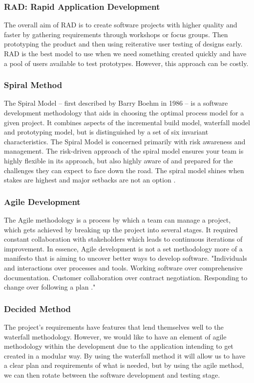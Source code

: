 \documentclass[a4paper,10pt]{article}
\begin{document}
\subsubsection{RAD: Rapid Application Development}
The overall aim of RAD is to create software projects with higher quality and faster by gathering requirements through workshops or focus groups. Then prototyping the product and then using reiterative user testing of designs early. RAD is the best model to use when we need something created quickly and have a pool of users available to test prototypes. However, this approach can be costly\cite{cscm01slides}. 

\subsubsection{Spiral Method}
The Spiral Model – first described by Barry Boehm in 1986 – is a software development methodology that aids in choosing the optimal process model for a given project. It combines aspects of the incremental build model, waterfall model and prototyping model, but is distinguished by a set of six invariant characteristics. The Spiral Model is concerned primarily with risk awareness and management. The risk-driven approach of the spiral model ensures your team is highly flexible in its approach, but also highly aware of and prepared for the challenges they can expect to face down the road. The spiral model shines when stakes are highest and major setbacks are not an option \cite{spiralmodel}.


\subsubsection{Agile Development}
The Agile methodology is a process by which a team can manage a project, which gets achieved by breaking up the project into several stages. It required constant collaboration with stakeholders which leads to continuous iterations of improvement. In essence, Agile development is not a set methodology more of a manifesto that is aiming to uncover better ways to develop software. "Individuals and interactions over processes and tools. Working software over comprehensive documentation. Customer collaboration over contract negotiation. Responding to change over following a plan \cite{agilemanifesto}."

\subsubsection{Decided Method}
The project's requirements have features that lend themselves well to the waterfall methodology. However, we would like to have an element of agile methodology within the development due to the application intending to get created in a modular way. By using the waterfall method it will allow us to have a clear plan and requirements of what is needed, but by using the agile method, we can then rotate between the software development and testing stage.
\end{document}
